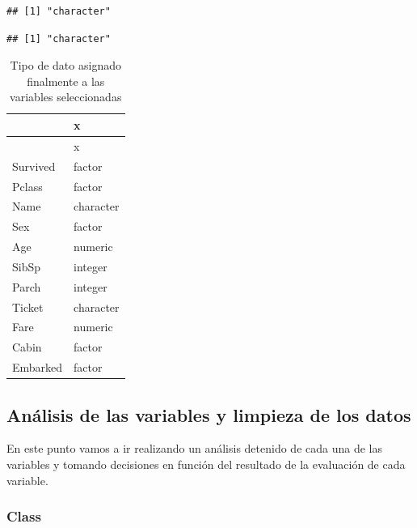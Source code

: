 \documentclass[]{article}
\newenvironment{Shaded}{\begin{snugshade}}{\end{snugshade}}
\newcommand{\KeywordTok}[1]{\textcolor[rgb]{0.13,0.29,0.53}{\textbf{#1}}}
\newcommand{\StringTok}[1]{\textcolor[rgb]{0.31,0.60,0.02}{#1}}
\newcommand{\OperatorTok}[1]{\textcolor[rgb]{0.81,0.36,0.00}{\textbf{#1}}}
\newcommand{\NormalTok}[1]{#1}
\begin{document}
\begin{Shaded}
\end{Shaded}

\begin{verbatim}
## [1] "character"
\end{verbatim}

\begin{Shaded}
\end{Shaded}

\begin{verbatim}
## [1] "character"
\end{verbatim}

\begin{longtable}[]{@{}ll@{}}
\caption{Tipo de dato asignado finalmente a las variables
seleccionadas}\tabularnewline
\toprule
& x\tabularnewline
\midrule
\endfirsthead
\toprule
& x\tabularnewline
\midrule
\endhead
Survived & factor\tabularnewline
Pclass & factor\tabularnewline
Name & character\tabularnewline
Sex & factor\tabularnewline
Age & numeric\tabularnewline
SibSp & integer\tabularnewline
Parch & integer\tabularnewline
Ticket & character\tabularnewline
Fare & numeric\tabularnewline
Cabin & factor\tabularnewline
Embarked & factor\tabularnewline
\bottomrule
\end{longtable}

\subsection{Análisis de las variables y limpieza de los
datos}\label{analisis-de-las-variables-y-limpieza-de-los-datos}

En este punto vamos a ir realizando un análisis detenido de cada una de
las variables y tomando decisiones en función del resultado de la
evaluación de cada variable.

\subsubsection{Class}\label{class}
\end{document}
